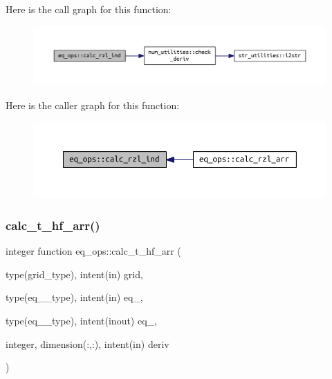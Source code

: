 Here is the call graph for this function\+:
\nopagebreak
\begin{figure}[H]
\begin{center}
\leavevmode
\includegraphics[width=350pt]{namespaceeq__ops_a42524ab0697a7a986e2f86c4c75cdc33_cgraph}
\end{center}
\end{figure}
Here is the caller graph for this function\+:
\nopagebreak
\begin{figure}[H]
\begin{center}
\leavevmode
\includegraphics[width=350pt]{namespaceeq__ops_a42524ab0697a7a986e2f86c4c75cdc33_icgraph}
\end{center}
\end{figure}
\mbox{\label{namespaceeq__ops_a64fe3de828eafa02ef635def9acafaed}} 
\subsubsection{\texorpdfstring{calc\+\_\+t\+\_\+hf\+\_\+arr()}{calc\_t\_hf\_arr()}}
{\footnotesize\ttfamily integer function eq\+\_\+ops\+::calc\+\_\+t\+\_\+hf\+\_\+arr (\begin{DoxyParamCaption}\item[{type(grid\+\_\+type), intent(in)}]{grid,  }\item[{type(eq\+\_\+1\+\_\+type), intent(in)}]{eq\+\_,  }\item[{type(eq\+\_\+2\+\_\+type), intent(inout)}]{eq\+\_,  }\item[{integer, dimension(\+:,\+:), intent(in)}]{deriv }\end{DoxyParamCaption})}




